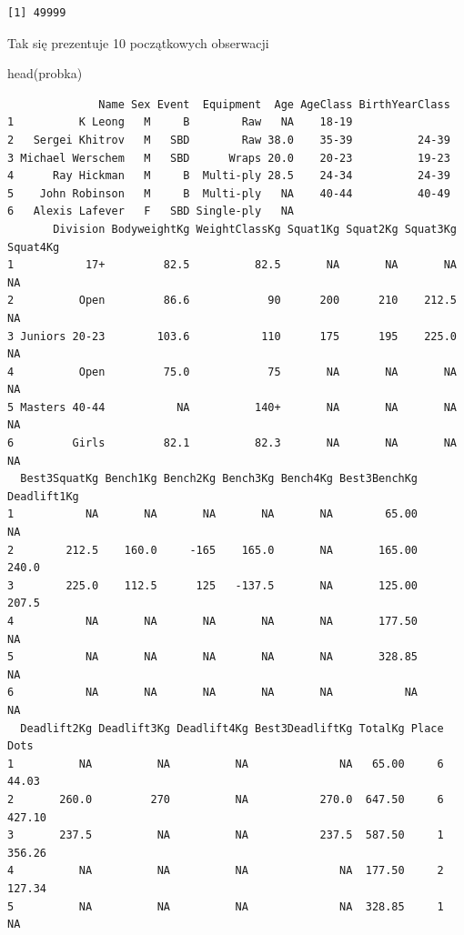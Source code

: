 \documentclass[
  letterpaper,
  DIV=11,
  numbers=noendperiod]{scrartcl}
\newenvironment{Shaded}{\begin{snugshade}}{\end{snugshade}}
\newcommand{\FunctionTok}[1]{\textcolor[rgb]{0.28,0.35,0.67}{#1}}
\newcommand{\NormalTok}[1]{\textcolor[rgb]{0.00,0.23,0.31}{#1}}
\begin{document}
\begin{verbatim}
[1] 49999
\end{verbatim}

Tak się prezentuje 10 początkowych obserwacji

\begin{Shaded}
\begin{Highlighting}[]
\FunctionTok{head}\NormalTok{(probka)}
\end{Highlighting}
\end{Shaded}

\begin{verbatim}
              Name Sex Event  Equipment  Age AgeClass BirthYearClass
1          K Leong   M     B        Raw   NA    18-19               
2   Sergei Khitrov   M   SBD        Raw 38.0    35-39          24-39
3 Michael Werschem   M   SBD      Wraps 20.0    20-23          19-23
4      Ray Hickman   M     B  Multi-ply 28.5    24-34          24-39
5    John Robinson   M     B  Multi-ply   NA    40-44          40-49
6   Alexis Lafever   F   SBD Single-ply   NA                        
       Division BodyweightKg WeightClassKg Squat1Kg Squat2Kg Squat3Kg Squat4Kg
1           17+         82.5          82.5       NA       NA       NA       NA
2          Open         86.6            90      200      210    212.5       NA
3 Juniors 20-23        103.6           110      175      195    225.0       NA
4          Open         75.0            75       NA       NA       NA       NA
5 Masters 40-44           NA          140+       NA       NA       NA       NA
6         Girls         82.1          82.3       NA       NA       NA       NA
  Best3SquatKg Bench1Kg Bench2Kg Bench3Kg Bench4Kg Best3BenchKg Deadlift1Kg
1           NA       NA       NA       NA       NA        65.00          NA
2        212.5    160.0     -165    165.0       NA       165.00       240.0
3        225.0    112.5      125   -137.5       NA       125.00       207.5
4           NA       NA       NA       NA       NA       177.50          NA
5           NA       NA       NA       NA       NA       328.85          NA
6           NA       NA       NA       NA       NA           NA          NA
  Deadlift2Kg Deadlift3Kg Deadlift4Kg Best3DeadliftKg TotalKg Place   Dots
1          NA          NA          NA              NA   65.00     6  44.03
2       260.0         270          NA           270.0  647.50     6 427.10
3       237.5          NA          NA           237.5  587.50     1 356.26
4          NA          NA          NA              NA  177.50     2 127.34
5          NA          NA          NA              NA  328.85     1     NA

\end{verbatim}
\end{document}

